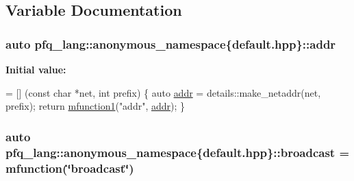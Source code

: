 \subsection{Variable Documentation}
\hypertarget{namespacepfq__lang_1_1anonymous__namespace_02default_8hpp_03_aafce8334d1be83bff9a2115439c8c453}{
\subsubsection[{addr}]{\setlength{\rightskip}{0pt plus 5cm}auto pfq\+\_\+lang\+::anonymous\+\_\+namespace\{default.\+hpp\}\+::addr}}\label{namespacepfq__lang_1_1anonymous__namespace_02default_8hpp_03_aafce8334d1be83bff9a2115439c8c453}
{\bfseries Initial value\+:}
\begin{DoxyCode}
= [] (\textcolor{keyword}{const} \textcolor{keywordtype}{char} *net, \textcolor{keywordtype}{int} prefix)
        \{
            \textcolor{keyword}{auto} \hyperlink{namespacepfq__lang_1_1anonymous__namespace_02default_8hpp_03_aafce8334d1be83bff9a2115439c8c453}{addr} = details::make\_netaddr(net, prefix);
            \textcolor{keywordflow}{return} \hyperlink{namespacepfq__lang_a3cc9d61411c0398bb46aa2b33a21f7ed}{mfunction1}(\textcolor{stringliteral}{"addr"}, \hyperlink{namespacepfq__lang_1_1anonymous__namespace_02default_8hpp_03_aafce8334d1be83bff9a2115439c8c453}{addr});
        \}
\end{DoxyCode}
\hypertarget{namespacepfq__lang_1_1anonymous__namespace_02default_8hpp_03_a3b7dd001dfb2302c93212313c0bfa82a}{
\subsubsection[{broadcast}]{\setlength{\rightskip}{0pt plus 5cm}auto pfq\+\_\+lang\+::anonymous\+\_\+namespace\{default.\+hpp\}\+::broadcast = {\bf mfunction}(\char`\"{}broadcast\char`\"{})}}\label{namespacepfq__lang_1_1anonymous__namespace_02default_8hpp_03_a3b7dd001dfb2302c93212313c0bfa82a}
